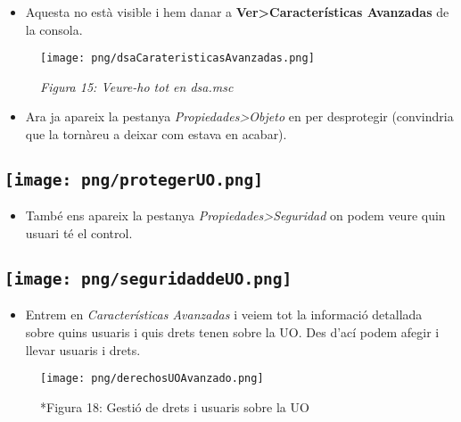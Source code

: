 \documentclass[
  a4paper,
]{article}
\providecommand{\tightlist}{%
  \setlength{\itemsep}{0pt}\setlength{\parskip}{0pt}}
\begin{document}
\begin{itemize}
\tightlist
\item
  Aquesta no està visible i hem danar a
  \textbf{Ver\textgreater Características Avanzadas} de la consola.
\end{itemize}

\begin{figure}
\centering
\texttt{[image: png/dsaCarateristicasAvanzadas.png]}
\caption{\emph{Figura 15: Veure-ho tot en dsa.msc}}
\end{figure}

\begin{itemize}
\tightlist
\item
  Ara ja apareix la pestanya \emph{Propiedades\textgreater Objeto} en
  per desprotegir (convindria que la tornàreu a deixar com estava en
  acabar).
\end{itemize}

\subsection{\texorpdfstring{\protect\texttt{[image: png/protegerUO.png]}}{Figura 16: Desprotegir temporalment les UO}}\label{figura-16-desprotegir-temporalment-les-uo}

\begin{itemize}
\tightlist
\item
  També ens apareix la pestanya \emph{Propiedades\textgreater Seguridad}
  on podem veure quin usuari té el control.
\end{itemize}

\subsection{\texorpdfstring{\protect\texttt{[image: png/seguridaddeUO.png]}}{Figura 17: Qui té el control de la UO}}\label{figura-17-qui-tuxe9-el-control-de-la-uo}

\begin{itemize}
\tightlist
\item
  Entrem en \emph{Características Avanzadas} i veiem tot la informació
  detallada sobre quins usuaris i quis drets tenen sobre la UO. Des
  d'ací podem afegir i llevar usuaris i drets.
\end{itemize}

\begin{figure}
\centering
\texttt{[image: png/derechosUOAvanzado.png]}
\caption{*Figura 18: Gestió de drets i usuaris sobre la UO}
\end{figure}
\end{document}
